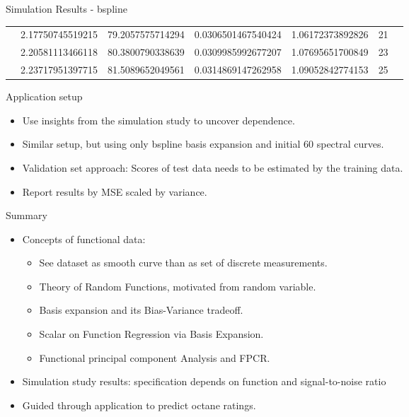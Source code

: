 \documentclass{beamer}
\begin{document}
\begin{frame}{Simulation Results - bspline}
\begin{table}
{\begin{tabular}{lllllll}
 & 2.17750745519215                       & 79.2057575714294                        & 0.0306501467540424                        & 1.06172373892826                         & 21               &  \\
 & 2.20581113466118                       & 80.3800790338639                        & 0.0309985992677207                        & 1.07695651700849                         & 23               &  \\
 & 2.23717951397715                       & 81.5089652049561                        & 0.0314869147262958                        & 1.09052842774153                         & 25               & 
\end{tabular}%
}
\end{table}
	\end{frame}
	
	
	
		
		
		
	\begin{frame}{Application setup}
		\begin{itemize}
		\item
    		Use insights from the simulation study to uncover dependence.
    		\item
    		Similar setup, but using only bspline basis expansion and initial 60 spectral curves.
    		\item
    		Validation set approach:	Scores of test data needs to be estimated by the training data. 
    		\item
    		Report results by MSE scaled by variance.
		\end{itemize}
	\end{frame}
	
	\begin{frame}{Summary}
		\begin{itemize}
		\item
    		Concepts of functional data: 
    		\begin{itemize}
			\item See dataset as smooth curve than as set of discrete measurements.
    			\item Theory of Random Functions, motivated from random variable.
    			\item Basis expansion and its Bias-Variance tradeoff.
    			\item Scalar on Function Regression via Basis Expansion.
    			\item Functional principal component Analysis and FPCR.
		\end{itemize}
    		\item
    		Simulation study results: specification depends on function and signal-to-noise ratio
    		\item
    		Guided through application to predict octane ratings.
    		
		\end{itemize}
	\end{frame}
	
\end{document}
